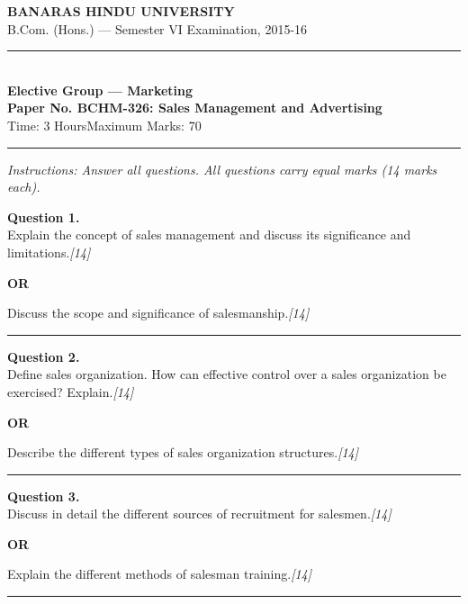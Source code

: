 \documentclass[11pt,a4paper]{article}
\newcommand{\pts}[1]{\hfill   \textit{[#1]}}
\begin{document}
\begin{center}
  {\large\bfseries BANARAS HINDU UNIVERSITY}\\[2pt]
  {\normalsize B.Com. (Hons.) --- Semester VI Examination, 2015-16}\\[6pt]
  \rule{0.8\linewidth}{0.5pt}\\[6pt]
  {\large\bfseries Elective Group --- Marketing}\\[4pt]
  {\large\bfseries Paper No. BCHM-326: Sales Management and Advertising}\\[4pt]
  {\normalsize Time: 3 Hours\hfill Maximum Marks: 70}
\end{center}

\rule{\linewidth}{0.4pt}

\smallskip



\noindent   \textit{Instructions: Answer all questions. All questions carry equal marks (14 marks each).}

\bigskip




\noindent   \textbf{Question 1.} \\
Explain the concept of sales management and discuss its significance and limitations.\pts{14}

\centerline{   \textbf{OR}}

Discuss the scope and significance of salesmanship.\pts{14}

\medskip\rule{\linewidth}{0.2pt}




\noindent   \textbf{Question 2.} \\
Define sales organization. How can effective control over a sales organization be exercised? Explain.\pts{14}

\centerline{   \textbf{OR}}

Describe the different types of sales organization structures.\pts{14}

\medskip\rule{\linewidth}{0.2pt}

\pagebreak




\noindent   \textbf{Question 3.} \\
Discuss in detail the different sources of recruitment for salesmen.\pts{14}

\centerline{   \textbf{OR}}

Explain the different methods of salesman training.\pts{14}

\medskip\rule{\linewidth}{0.2pt}
\end{document}
